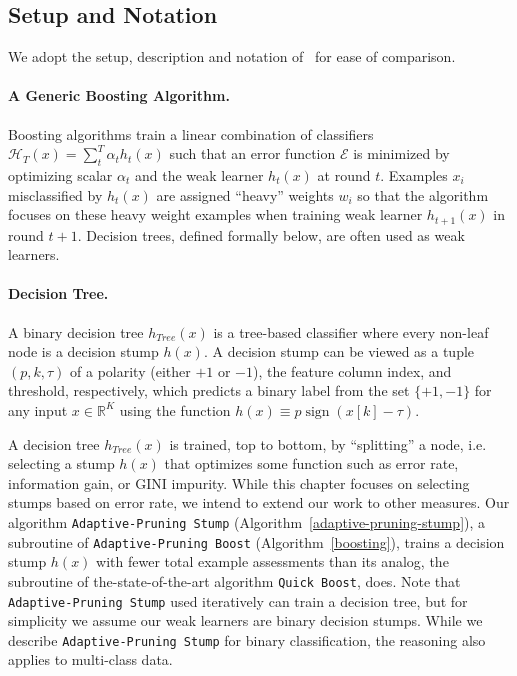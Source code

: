 \subsection{Setup and Notation}
We adopt the setup, 
description and notation of~\citet{icml2013_appel13} for ease of
comparison.  

\paragraph {A Generic Boosting Algorithm.}
Boosting algorithms train a linear combination of classifiers
$\mathcal{H}_T(x)=\sum^T_t {\alpha_t h_t(x)}$
such that an error function $\mathcal{E}$ is minimized by optimizing scalar
$\alpha_t$ and the weak learner $h_t(x)$ at round $t$.
Examples $x_i$ misclassified by $h_t(x)$ are assigned ``heavy'' weights $w_i$
so that the algorithm focuses on these heavy weight examples when training weak
learner $h_{t+1}(x)$ in round $t+1$.
Decision trees, defined formally below, are often used as weak learners.

\paragraph {Decision Tree.}  A binary decision tree $h_{\textit{Tree}}(x)$ is a
tree-based classifier where every non-leaf node is a decision stump
$h(x)$.  A decision stump can be viewed as a tuple $(p, k, \tau)$ of a
polarity (either $+1$ or $-1$), the feature column index, and
threshold, respectively, which predicts a binary label from the set
$\{+1, -1\}$ for any input $x \in \mathbb{R}^K$ using the function
$h(x) \equiv p\mathop{\mathrm{sign}}(x[k] - \tau)$.

A decision tree $h_{\textit{Tree}}(x)$ is trained, top to bottom, by
``splitting'' a node, i.e. selecting a stump $h(x)$ that optimizes
some function such as error rate, information gain, or GINI impurity.  
While this chapter focuses on selecting stumps based on
error rate, we intend to extend our work to other measures.
Our algorithm \texttt{Adaptive-Pruning Stump} (Algorithm~\ref{adaptive-pruning-stump}), a subroutine of \texttt{Adaptive-Pruning Boost} (Algorithm~\ref{boosting}), trains a decision stump $h(x)$ with
fewer total example assessments than its analog, the subroutine of the-state-of-the-art algorithm
\texttt{Quick Boost}, does. Note that \texttt{Adaptive-Pruning Stump} used iteratively can train a decision tree, but for simplicity we assume our weak learners are binary decision stumps.
While we describe \texttt{Adaptive-Pruning Stump} for
binary classification, the reasoning also applies to multi-class data.

